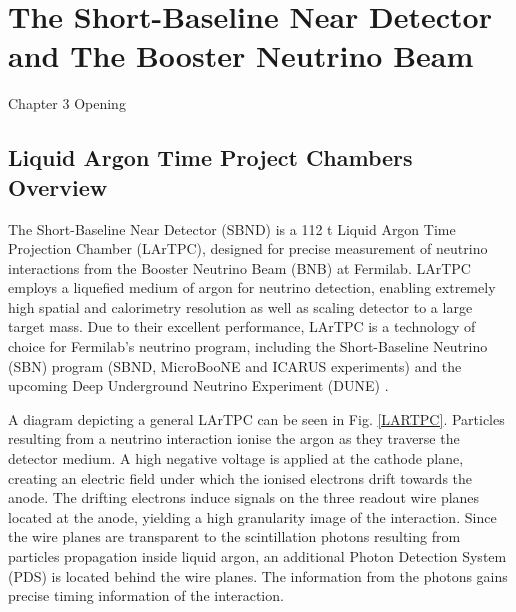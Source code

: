 \chapter{The Short-Baseline Near Detector and The Booster Neutrino Beam}

\ifpdf
    \graphicspath{{Chapter3/Figs/Raster/}{Chapter3/Figs/PDF/}{Chapter3/Figs/}}
\else
    \graphicspath{{Chapter3/Figs/Vector/}{Chapter3/Figs/}}
\fi


Chapter 3 Opening

\newpage

\section{Liquid Argon Time Project Chambers Overview}

The Short-Baseline Near Detector (SBND) is a 112 t Liquid Argon Time Projection Chamber (LArTPC), designed for precise measurement of neutrino interactions from the Booster Neutrino Beam (BNB) at Fermilab.
LArTPC employs a liquefied medium of argon for neutrino detection, enabling extremely high spatial and calorimetry resolution as well as scaling detector to a large target mass.
Due to their excellent performance, LArTPC is a technology of choice for Fermilab's neutrino program, including the Short-Baseline Neutrino (SBN) program \cite{} (SBND, MicroBooNE and ICARUS experiments) and the upcoming Deep Underground Neutrino Experiment (DUNE) \cite{}.

A diagram depicting a general LArTPC can be seen in Fig. \ref{LARTPC}.
Particles resulting from a neutrino interaction ionise the argon as they traverse the detector medium.
A high negative voltage is applied at the cathode plane, creating an electric field under which the ionised electrons drift towards the anode.
The drifting electrons induce signals on the three readout wire planes located at the anode, yielding a high granularity image of the interaction.
Since the wire planes are transparent to the scintillation photons resulting from particles propagation inside liquid argon, an additional Photon Detection System (PDS) is located behind the wire planes.
The information from the photons gains precise timing information of the interaction.

